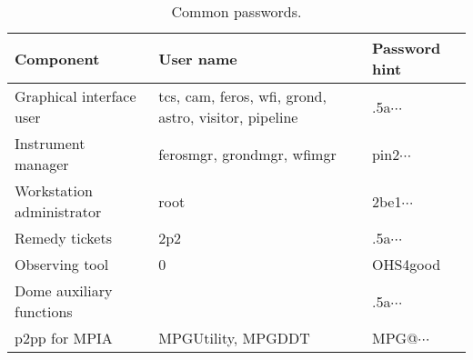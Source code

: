 \documentclass[11pt,fleqn]{book} %
\begin{document}
\begin{table}
\caption{Common passwords.}
\centering
\begin{tabular}{lll}
\hline
Component                 &  User name                                            & Password hint\\
\hline\hline
Graphical interface user  & tcs, cam, feros, wfi, grond, astro, visitor, pipeline & .5a$\cdots$\\
Instrument manager        & ferosmgr, grondmgr, wfimgr                            & pin2$\cdots$\\
Workstation administrator & root                                                  & 2be1$\cdots$\\
Remedy tickets            & 2p2                                                   & .5a$\cdots$\\
Observing tool            & 0                                                     & OHS4good\\
Dome auxiliary functions  &                                                       & .5a$\cdots$\\
p2pp for MPIA             & MPGUtility, MPGDDT                                    & MPG@$\cdots$\\
\hline
\end{tabular}
\end{table}
\end{document}
